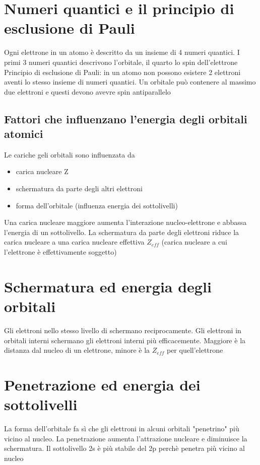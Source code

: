 \documentclass[a4paper,11pt]{report}
\begin{document}
\section{Numeri quantici e il principio di esclusione di Pauli}

Ogni elettrone in un atomo è descritto da un insieme di 4 numeri quantici. 
I primi 3 numeri quantici descrivono l'orbitale, il quarto lo spin dell'elettrone \newline
Principio di esclusione di Pauli: in un atomo non possono esistere 2 elettroni aventi lo stesso insieme di numeri quantici. 
Un orbitale può contenere al massimo due elettroni e questi devono avevre spin antiparallelo

\subsection*{Fattori che influenzano l'energia degli orbitali atomici}

Le cariche geli orbitali sono influenzata da 
	\begin{itemize}
		\item carica nucleare Z
		\item schermatura da parte degli altri elettroni
		\item forma dell'orbitale (influenza energia dei sottolivelli)
	\end{itemize}
Una carica nucleare maggiore aumenta l'interazione nucleo-elettrone e abbassa l'energia di un sottolivello.
La schermatura da parte degli elettroni riduce la carica nucleare a una carica nucleare effettiva $Z_{eff}$ (carica nucleare a cui l'elettrone è effettivamente soggetto)

\section{Schermatura ed energia degli orbitali}

Gli elettroni nello stesso livello di schermano reciprocamente. 
Gli elettroni in orbitali interni schermano gli elettroni interni più efficacemente.
Maggiore è la distanza dal nucleo di un elettrone, minore è la $Z_{eff}$ per quell'elettrone

\section{Penetrazione ed energia dei sottolivelli}

La forma dell'orbitale fa sì che gli elettroni in alcuni orbitali "penetrino" più vicino al nucleo.
La penetrazione aumenta l'attrazione nucleare e diminuisce la schermatura.
Il sottolivello 2s è più stabile del 2p perchè penetra più vicino al nucleo
\end{document}
